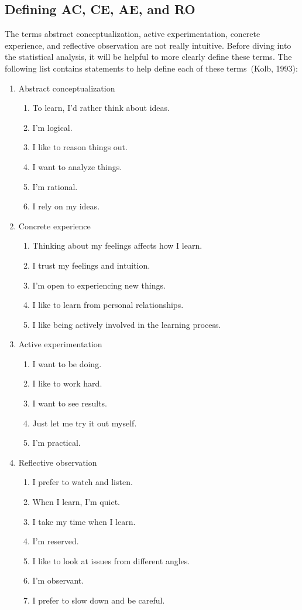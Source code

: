 \subsection{Defining AC, CE, AE, and RO}
The terms abstract conceptualization, active experimentation, concrete experience, and reflective observation are not really intuitive. Before diving into the statistical analysis, it will be helpful to more clearly define these terms. The following list contains statements to help define each of these terms~(Kolb, 1993):
\begin{enumerate}
  \item Abstract conceptualization
  \begin{enumerate}
    \item To learn, I'd rather think about ideas.
    \item I'm logical.
    \item I like to reason things out.
    \item I want to analyze things.
    \item I'm rational.
    \item I rely on my ideas.
  \end{enumerate}
  \item Concrete experience
  \begin{enumerate}
    \item Thinking about my feelings affects how I learn.
    \item I trust my feelings and intuition.
    \item I'm open to experiencing new things.
    \item I like to learn from personal relationships.
    \item I like being actively involved in the learning process.
  \end{enumerate}
  \item Active experimentation
  \begin{enumerate}
    \item I want to be doing.
    \item I like to work hard.
    \item I want to see results.
    \item Just let me try it out myself.
    \item I'm practical.
  \end{enumerate}
  \item Reflective observation
  \begin{enumerate}
    \item I prefer to watch and listen.
    \item When I learn, I'm quiet.
    \item I take my time when I learn.
    \item I'm reserved.
    \item I like to look at issues from different angles.
    \item I'm observant.
    \item I prefer to slow down and be careful.
  \end{enumerate}
\end{enumerate}

